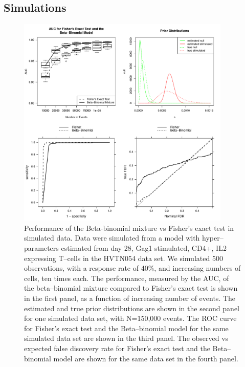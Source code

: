 \documentclass[11pt]{article}
\begin{document}
\subsection*{Simulations}
\begin{figure}[htbp] %
   \centering
   \includegraphics[width=4in]{Figures/simulations} 
   \caption{Performance of the Beta-binomial mixture vs Fisher's exact test in simulated data. Data were simulated from a model with hyper--parameters estimated from day 28, Gag1 stimulated, CD4+, IL2 expressing T--cells in the HVTN054 data set. We simulated 500 observations, with a response rate of 40\%, and increasing numbers of cells, ten times each. The performance, measured by the AUC, of the beta--binomial mixture compared to Fisher's exact test is shown in the first panel, as a function of increasing number of events. The estimated and true prior distributions are shown in the second panel for one simulated data set, with N=150,000 events. The ROC curve for Fisher's exact test and the Beta--binomial model for the same simulated data set are shown in the third panel. The observed vs expected false discovery rate for Fisher's exact test and the Beta--binomial model are shown for the same data set in the fourth panel.}
   \label{fig:simulations}
\end{figure}
\end{document}
